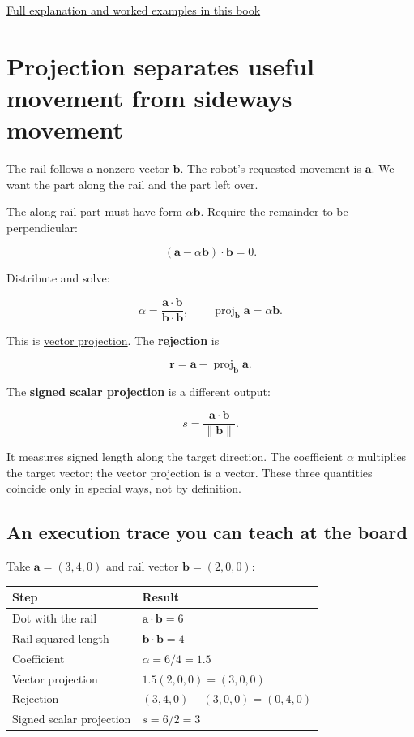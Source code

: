 \hyperref[01-foundations-i-ch020-qr-turns-least-squares-into-a-triangular-solve-plus-an-irreducible-residual]{Full explanation and worked examples in this book}

\section{Projection separates useful movement from sideways movement}\label{01-foundations-i-ch017-projection-separates-useful-movement-from-sideways-movement}

The rail follows a nonzero vector \(\mathbf b\). The robot's requested movement is \(\mathbf a\). We want the part along the rail and the part left over.

The along-rail part must have form \(\alpha\mathbf b\). Require the remainder to be perpendicular:

\[
(\mathbf a-\alpha\mathbf b)\cdot\mathbf b=0.
\]

Distribute and solve:

\[
\alpha=\frac{\mathbf a\cdot\mathbf b}{\mathbf b\cdot\mathbf b},\qquad
\operatorname{proj}_{\mathbf b}\mathbf a=\alpha\mathbf b.
\]

This is \hyperref[01-foundations-i-ch017-projection-separates-useful-movement-from-sideways-movement]{vector projection}. The \textbf{rejection} is

\[
\mathbf r=\mathbf a-\operatorname{proj}_{\mathbf b}\mathbf a.
\]

The \textbf{signed scalar projection} is a different output:

\[
s=\frac{\mathbf a\cdot\mathbf b}{\|\mathbf b\|}.
\]

It measures signed length along the target direction. The coefficient \(\alpha\) multiplies the target vector; the vector projection is a vector. These three quantities coincide only in special ways, not by definition.

\subsection{An execution trace you can teach at the board}\label{01-foundations-i-ch017-an-execution-trace-you-can-teach-at-the-board}

Take \(\mathbf a=(3,4,0)\) and rail vector \(\mathbf b=(2,0,0)\):

{\def\LTcaptype{none} %
\begin{longtable}[]{@{}ll@{}}
\toprule\noalign{}
Step & Result \\
\midrule\noalign{}
\endhead
\bottomrule\noalign{}
\endlastfoot
Dot with the rail & \(\mathbf a\cdot\mathbf b=6\) \\
Rail squared length & \(\mathbf b\cdot\mathbf b=4\) \\
Coefficient & \(\alpha=6/4=1.5\) \\
Vector projection & \(1.5(2,0,0)=(3,0,0)\) \\
Rejection & \((3,4,0)-(3,0,0)=(0,4,0)\) \\
Signed scalar projection & \(s=6/2=3\) \\
\end{longtable}
}

